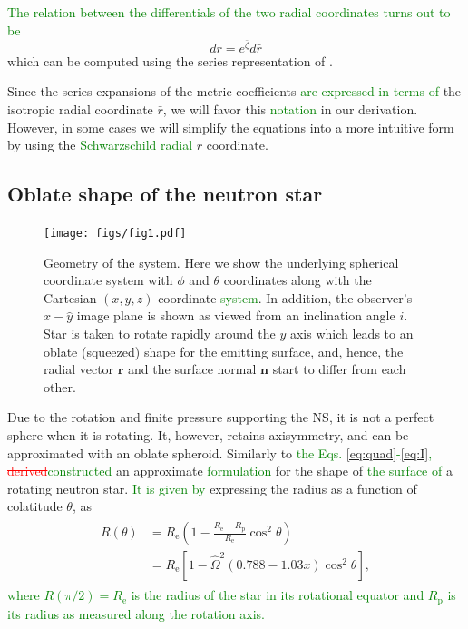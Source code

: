 \documentclass{aa}
\newcommand{\be}{\begin{equation}}
\newcommand{\ee}{\end{equation}}
\renewcommand{\vec}[1]{\ensuremath{\boldsymbol{#1}}}
\newcommand{\refe}[1]{\textcolor{green}{{#1}}}
\newcommand{\refedel}[1]{\textcolor{red}{\sout{#1}}}
\newcommand{\Req}{\ensuremath{R_{\mathrm{e}}}}
\newcommand{\sch}{Schwarzschild }
\newcommand{\rb}{\ensuremath{\bar{r}}}
\newcommand{\Ob}{\ensuremath{\hat{\Omega}}}
\newcommand{\zetab}{\ensuremath{\bar{\zeta}}}
\begin{document}
\refe{The relation between the differentials of the two radial coordinates turns out to be}
\be\label{eq:drb2dr}
dr = e^{\zetab} d\rb
\ee
which can be computed using the series representation of \cite{BI76}.

Since the series expansions of the metric coefficients \refe{are expressed in terms of} the isotropic radial coordinate $\rb$, we will favor this \refe{notation} in our derivation.  
However, in some cases we will simplify the equations into a more intuitive form by using the \refe{\sch radial} $r$ coordinate.


\subsection{Oblate shape of the neutron star}\label{sect:oblate}

\begin{figure}
\centering
\texttt{[image: figs/fig1.pdf]}
\caption{\label{fig:geom}
Geometry of the system. Here we show the underlying spherical coordinate system with $\phi$ and $\theta$ coordinates along with the Cartesian $(x,y,z)$ coordinate \refe{system}.
In addition, the observer's $\hat{x}-\hat{y}$ image plane is shown as viewed from an inclination angle $i$.
Star is taken to rotate rapidly around the $y$ axis which leads to an oblate (squeezed) shape for the emitting surface, and, hence, the radial vector $\vec{r}$ and the surface normal $\vec{n}$ start to differ from each other.
}
\end{figure}

Due to the rotation and finite pressure supporting the NS, it is not a perfect sphere when it is rotating.  
It, however, retains axisymmetry, and can be approximated with an oblate spheroid.  
Similarly to \refe{the Eqs. \eqref{eq:quad}-\eqref{eq:I},} \citet{aGM14} \refedel{derived}\refe{constructed} an approximate \refe{formulation} for the shape of \refe{the surface of} a rotating neutron star. 
\refe{It is given by} expressing the radius as a function of colatitude $\theta$, as 
\begin{align}\begin{split}\label{eq:radf}
    R(\theta) &= \Req \left( 1 - \frac{\Req - R_{\mathrm{p}}}{\Req} \cos^2\theta \right) \\
              &= \Req [1-\Ob^2 (0.788 - 1.03x) \cos^2 \theta],
\end{split}\end{align}
\refe{where $R(\pi/2) = \Req$ is the radius of the star in its rotational equator and $R_{\mathrm{p}}$ is its radius as measured along the rotation axis.}
\end{document}
